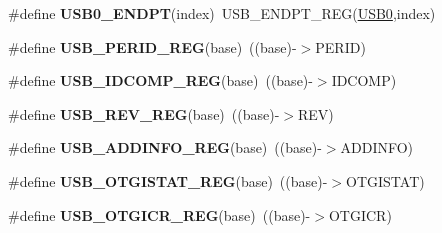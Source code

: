 \begin{DoxyCompactItemize}
\item 
\#define {\bfseries U\+S\+B0\+\_\+\+E\+N\+D\+PT}(index)~U\+S\+B\+\_\+\+E\+N\+D\+P\+T\+\_\+\+R\+EG(\hyperlink{group__USB__Peripheral__Access__Layer_gaea56c015ce8ad0cc88464060fde6d87c}{U\+S\+B0},index)\hypertarget{group__USB__Register__Accessor__Macros_gab12df1a4de08fae1e4662a2cb4060b5e}{}\label{group__USB__Register__Accessor__Macros_gab12df1a4de08fae1e4662a2cb4060b5e}

\item 
\#define {\bfseries U\+S\+B\+\_\+\+P\+E\+R\+I\+D\+\_\+\+R\+EG}(base)~((base)-\/$>$P\+E\+R\+ID)\hypertarget{group__USB__Register__Accessor__Macros_ga61c99097ee83a271dafdfb6b04980cc8}{}\label{group__USB__Register__Accessor__Macros_ga61c99097ee83a271dafdfb6b04980cc8}

\item 
\#define {\bfseries U\+S\+B\+\_\+\+I\+D\+C\+O\+M\+P\+\_\+\+R\+EG}(base)~((base)-\/$>$I\+D\+C\+O\+MP)\hypertarget{group__USB__Register__Accessor__Macros_ga74152969f2622631ccd8ceccf72c4e7e}{}\label{group__USB__Register__Accessor__Macros_ga74152969f2622631ccd8ceccf72c4e7e}

\item 
\#define {\bfseries U\+S\+B\+\_\+\+R\+E\+V\+\_\+\+R\+EG}(base)~((base)-\/$>$R\+EV)\hypertarget{group__USB__Register__Accessor__Macros_gafdbb3ea723c0bb8a1f5bb42e84fbdfe5}{}\label{group__USB__Register__Accessor__Macros_gafdbb3ea723c0bb8a1f5bb42e84fbdfe5}

\item 
\#define {\bfseries U\+S\+B\+\_\+\+A\+D\+D\+I\+N\+F\+O\+\_\+\+R\+EG}(base)~((base)-\/$>$A\+D\+D\+I\+N\+FO)\hypertarget{group__USB__Register__Accessor__Macros_ga618d42fa57e39a224a30a72f347573fb}{}\label{group__USB__Register__Accessor__Macros_ga618d42fa57e39a224a30a72f347573fb}

\item 
\#define {\bfseries U\+S\+B\+\_\+\+O\+T\+G\+I\+S\+T\+A\+T\+\_\+\+R\+EG}(base)~((base)-\/$>$O\+T\+G\+I\+S\+T\+AT)\hypertarget{group__USB__Register__Accessor__Macros_ga1b290906273a7a293d262a00c3425319}{}\label{group__USB__Register__Accessor__Macros_ga1b290906273a7a293d262a00c3425319}

\item 
\#define {\bfseries U\+S\+B\+\_\+\+O\+T\+G\+I\+C\+R\+\_\+\+R\+EG}(base)~((base)-\/$>$O\+T\+G\+I\+CR)\hypertarget{group__USB__Register__Accessor__Macros_ga96be0cb820aa0542e4c046f814b61636}{}\label{group__USB__Register__Accessor__Macros_ga96be0cb820aa0542e4c046f814b61636}


\end{DoxyCompactItemize}

